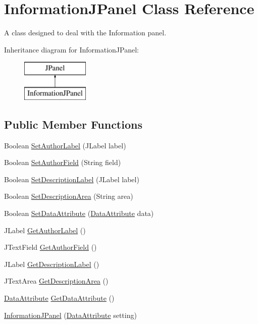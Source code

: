 \hypertarget{class_information_j_panel}{\section{Information\-J\-Panel Class Reference}
\label{class_information_j_panel}
}


A class designed to deal with the Information panel.  


Inheritance diagram for Information\-J\-Panel\-:\begin{figure}[H]
\begin{center}
\leavevmode
\includegraphics[height=2.000000cm]{class_information_j_panel}
\end{center}
\end{figure}
\subsection*{Public Member Functions}
\begin{DoxyCompactItemize}
\item 
Boolean \hyperlink{class_information_j_panel_a26ab40e4b038442c1d0ad31bb3f5e180}{Set\-Author\-Label} (J\-Label label)
\item 
Boolean \hyperlink{class_information_j_panel_a19b28c461ef20fceb876afa04ef56f3e}{Set\-Author\-Field} (String field)
\item 
Boolean \hyperlink{class_information_j_panel_af098ca9a5d335f46b9b64b5530dfa326}{Set\-Description\-Label} (J\-Label label)
\item 
Boolean \hyperlink{class_information_j_panel_acdc378d528647247674ccf45b071e329}{Set\-Description\-Area} (String area)
\item 
Boolean \hyperlink{class_information_j_panel_ac051ccc3facbbb65afcb8e3246157000}{Set\-Data\-Attribute} (\hyperlink{class_data_attribute}{Data\-Attribute} data)
\item 
J\-Label \hyperlink{class_information_j_panel_a56627ef87297c80e92b05db708a478e2}{Get\-Author\-Label} ()
\item 
J\-Text\-Field \hyperlink{class_information_j_panel_a5a315426cb0994bdcf41713930ffc16c}{Get\-Author\-Field} ()
\item 
J\-Label \hyperlink{class_information_j_panel_a6e2933b638efb56af0c3b7a350222e11}{Get\-Description\-Label} ()
\item 
J\-Text\-Area \hyperlink{class_information_j_panel_a836fd4b83ed476210ba7cbbc10fcf454}{Get\-Description\-Area} ()
\item 
\hyperlink{class_data_attribute}{Data\-Attribute} \hyperlink{class_information_j_panel_aecd081b72d4c75f3a6a92c3edeaf3693}{Get\-Data\-Attribute} ()
\item 
\hyperlink{class_information_j_panel_a78d613b372ae117671a19ee3fffea5f3}{Information\-J\-Panel} (\hyperlink{class_data_attribute}{Data\-Attribute} setting)
\end{DoxyCompactItemize}

